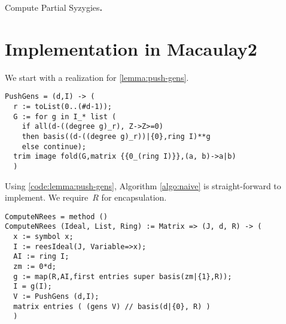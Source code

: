 \documentclass[fleqn,reqno]{amsart}
\begin{document}
\begin{algorithm}{\sc Compute Partial Syzygies}{\bf.}
\label{algo:compute-Ni}
\begin{algorithmic}
\EndFor
{}
\end{algorithmic}
\end{algorithm}



\section{Implementation in Macaulay2}
\label{sec:implementation}

\begin{paragraf}
\label{code:lemma:push-gens}
We start with a realization for \eqref{lemma:push-gens}.
\label{code:lemma:push-gens}
\begin{verbatim}
PushGens = (d,I) -> (
  r := toList(0..(#d-1));
  G := for g in I_* list (
    if all(d-((degree g)_r), Z->Z>=0)
    then basis((d-((degree g)_r))|{0},ring I)**g
    else continue);
  trim image fold(G,matrix {{0_(ring I)}},(a, b)->a|b)
  )
\end{verbatim}
\end{paragraf}

\begin{paragraf}
\label{code:algo:naive}
Using \eqref{code:lemma:push-gens},
Algorithm \ref{algo:naive} is straight-forward to implement.
We require~$R$ for encapsulation.
\begin{verbatim}
ComputeNRees = method ()
ComputeNRees (Ideal, List, Ring) := Matrix => (J, d, R) -> (
  x := symbol x;
  I := reesIdeal(J, Variable=>x);
  AI := ring I;
  zm := 0*d;
  g := map(R,AI,first entries super basis(zm|{1},R));
  I = g(I);
  V := PushGens (d,I);
  matrix entries ( (gens V) // basis(d|{0}, R) )
  )
\end{verbatim}
\end{paragraf}
\end{document}
